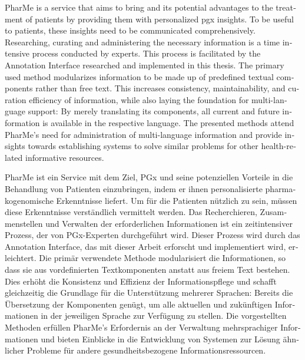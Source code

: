 \null\vfil
\begin{otherlanguage}{english}
\begin{center}\textsf{\textbf{\abstractname}}\end{center}

    \noindent PharMe is a service that aims to bring  and its
    potential advantages to the treatment of patients by providing them with
    personalized \gls{pgx} insights. To be useful to patients, these insights
    need to be communicated comprehensively. Researching, curating and
    administering the necessary information is a time intensive process
    conducted by  experts. This process is facilitated by the
    Annotation Interface researched and implemented in this thesis. The primary
    used method modularizes information to be made up of predefined textual
    components rather than free text. This increases consistency,
    maintainability, and curation efficiency of information, while also laying
    the foundation for multi-language support: By merely translating its
    components, all current and future information is available in the
    respective language. The presented methods attend PharMe's need for
    administration of multi-language information and provide insights towards
    establishing systems to solve similar problems for other health-related
    informative resources.

\end{otherlanguage}
\vfil\null

\null\vfil
\begin{otherlanguage}{ngerman}
\begin{center}\textsf{\textbf{\abstractname}}\end{center}

    \noindent PharMe ist ein Service mit dem Ziel, PGx und seine potenziellen
    Vorteile in die Behandlung von Patienten einzubringen, indem er ihnen
    personalisierte pharmakogenomische Erkenntnisse liefert. Um für die
    Patienten nützlich zu sein, müssen diese Erkenntnisse verständlich
    vermittelt werden. Das Recherchieren, Zusammenstellen und Verwalten der
    erforderlichen Informationen ist ein zeitintensiver Prozess, der von
    PGx-Experten durchgeführt wird. Dieser Prozess wird durch das Annotation
    Interface, das mit dieser Arbeit erforscht und implementiert wird,
    erleichtert. Die primär verwendete Methode modularisiert die Informationen,
    so dass sie aus vordefinierten Textkomponenten anstatt aus freiem Text
    bestehen. Dies erhöht die Konsistenz und Effizienz der Informationspflege
    und schafft gleichzeitig die Grundlage für die Unterstützung mehrerer
    Sprachen: Bereits die Übersetzung der Komponenten genügt, um alle aktuellen
    und zukünftigen Informationen in der jeweiligen Sprache zur Verfügung zu
    stellen. Die vorgestellten Methoden erfüllen PharMe's Erfordernis an der
    Verwaltung mehrsprachiger Informationen und bieten Einblicke in die
    Entwicklung von Systemen zur Lösung ähnlicher Probleme für andere
    gesundheitsbezogene Informationsressourcen.

\end{otherlanguage}
\vfil\null
